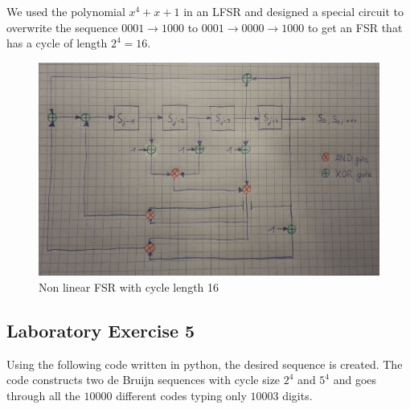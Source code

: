\documentclass{article}
\begin{document}
We used the polynomial $x^4 + x + 1$ in an LFSR and designed a special circuit to overwrite the sequence $0001 \longrightarrow 1000$ to $0001 \longrightarrow 0000 \longrightarrow 1000$ to get an FSR that has a cycle of length $2^4=16$.

\begin{figure}[H]
    \centering
    \includegraphics[scale=0.5]{NonLinearFSR.jpg}
    \caption{Non linear FSR with cycle length 16}
\end{figure}

\subsection{Laboratory Exercise 5}

Using the following code written in python, the desired sequence is created. The code constructs two de Bruijn sequences with cycle size $2^4$ and $5^4$ and goes through all the $10000$ different codes typing only $10003$ digits.
\end{document}

